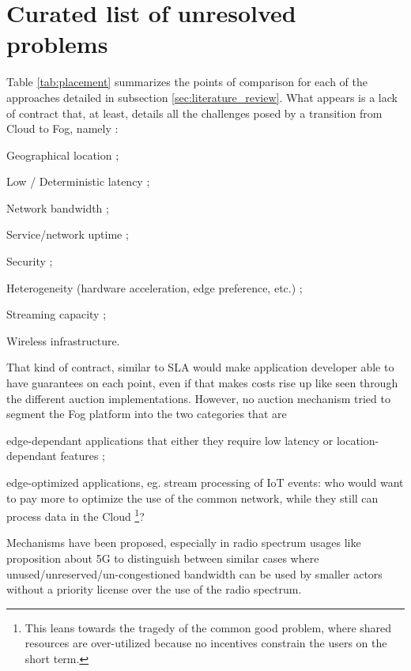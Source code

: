 \documentclass[11pt]{sdm}
\begin{document}
\section{Curated list of unresolved problems}
Table \ref{tab:placement} summarizes the points of comparison for each of the approaches detailed in subsection \ref{sec:literature_review}. What appears is a lack of contract that, at least, details all the challenges posed by a transition from Cloud to Fog, namely \cite{chiang_fog_2016, bonomi_fog_2012}:
\begin{enumerate*}[(I)]
	\item Geographical location ;
	\item Low / Deterministic latency ;
	\item Network bandwidth ;
	\item Service/network uptime ;
	\item Security ;
	\item Heterogeneity (hardware acceleration, edge preference, etc.) ;
	\item Streaming capacity ;
	\item Wireless infrastructure.
\end{enumerate*}
That kind of contract, similar to \gls{SLA} would make application developer able to have guarantees on each point, even if that makes costs rise up like seen through the different auction implementations. However, no auction mechanism tried to segment the Fog platform into the two categories that are 
\begin{enumerate*}[(A)]
	\item edge-dependant applications that either they require low latency or location-dependant features ;
	\item edge-optimized applications, eg. stream processing of \gls{IoT} events: who would want to pay more to optimize the use of the common network, while they still can process data in the Cloud \footnote{This leans towards the tragedy of the common good problem, where shared resources are over-utilized because no incentives constrain the users on the short term.}?
\end{enumerate*}
Mechanisms have been proposed, especially in radio spectrum usages like  proposition about 5G to distinguish between similar cases where unused/unreserved/un-congestioned bandwidth can be used by smaller actors without a priority license over the use of the radio spectrum.
\end{document}
